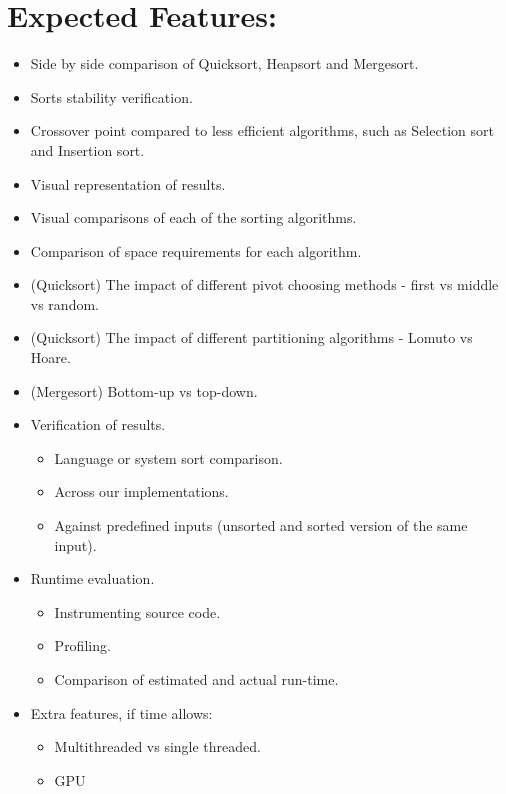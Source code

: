 \documentclass{article}
\begin{document}
\section*{Expected Features:} 
\begin{itemize}
\item Side by side comparison of Quicksort, Heapsort and Mergesort.
\item Sorts stability verification.
\item Crossover point compared to less efficient algorithms, such as Selection sort and Insertion sort.
\item Visual representation of results.
\item Visual comparisons of each of the sorting algorithms.
\item Comparison of space requirements for each algorithm.
\item (Quicksort) The impact of different pivot choosing methods - first vs middle vs random.
\item (Quicksort) The impact of different partitioning algorithms - Lomuto vs Hoare.
\item (Mergesort) Bottom-up vs top-down.
\item Verification of results.
\begin{itemize}
\item Language or system sort comparison.
\item Across our implementations.
\item Against predefined inputs (unsorted and sorted version of the same input).
\end{itemize}
\item Runtime evaluation.
\begin{itemize}
\item Instrumenting source code.
\item Profiling.
\item Comparison of estimated and actual run-time.
\end{itemize}
\item Extra features, if time allows: 
\begin{itemize}
\item Multithreaded vs single threaded.
\item GPU
\end{itemize}
\end{itemize}
\end{document}
